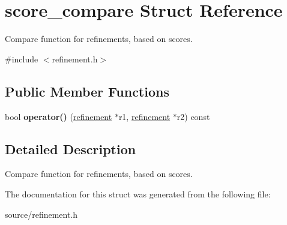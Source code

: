 \hypertarget{structscore__compare}{}\section{score\+\_\+compare Struct Reference}
\label{structscore__compare}


Compare function for refinements, based on scores.  




{\ttfamily \#include $<$refinement.\+h$>$}

\subsection*{Public Member Functions}
\begin{DoxyCompactItemize}
\item 
\mbox{\label{structscore__compare_a5a31522d733f25b96cd7f3d0b68e3553}} 
bool {\bfseries operator()} (\hyperlink{classrefinement}{refinement} $\ast$r1, \hyperlink{classrefinement}{refinement} $\ast$r2) const
\end{DoxyCompactItemize}


\subsection{Detailed Description}
Compare function for refinements, based on scores. 

The documentation for this struct was generated from the following file\+:\begin{DoxyCompactItemize}
\item 
source/refinement.\+h\end{DoxyCompactItemize}
